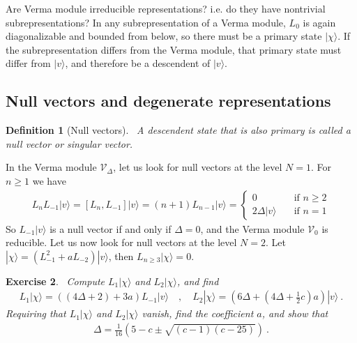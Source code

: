 \documentclass[12pt, a4paper]{article}
\theoremstyle{break}
\newtheorem{exo}{Exercise}[section]
\newtheorem{defn}[exo]{Definition}
\begin{document}
Are Verma module irreducible representations? i.e. do they have nontrivial subrepresentations? In any subrepresentation of a Verma module, $L_0$ is again diagonalizable and bounded from below, so there must be a primary state $|\chi\rangle$. If the subrepresentation differs from the Verma module, that primary state must differ from $|v\rangle$, and therefore be a descendent of $|v\rangle$.

\subsection{Null vectors and degenerate representations}\label{sec:nv}

\begin{defn}[Null vectors]
 ~\label{def:nv}
 A descendent state that is also primary is called a null vector or singular vector.
\end{defn}

In the Verma module $\mathcal V_\Delta$, let us look for null vectors at the level $N=1$. For $n\geq 1$ we have 
\begin{align}
L_n L_{-1}|v\rangle = [L_n, L_{-1}] |v\rangle = (n+1) L_{n-1}|v\rangle = 
\left\{\begin{array}{ll} 0 &  \quad \text{if } n\geq 2 \\ 2\Delta |v\rangle & \quad \text{if } n = 1 \end{array}\right. 
\end{align}
So $L_{-1}|v\rangle$ is a null vector if and only if $\Delta=0$, and the Verma module $\mathcal V_0$ is reducible.
Let us now look for null vectors at the level $N=2$. Let $|\chi\rangle = (L_{-1}^2 + a L_{-2})|v\rangle$, then $L_{n\geq 3} |\chi \rangle =0$. 

\begin{exo}
 ~\label{exo:level2}
 Compute  $L_1|\chi\rangle$ and $L_2|\chi\rangle$, and find 
 \begin{align}
  L_1 |\chi\rangle = \left((4\Delta+2) + 3a\right) L_{-1}|v\rangle
  \quad , \quad L_2 |\chi\rangle= \left(6\Delta + (4\Delta +\tfrac12 c)a\right) |v\rangle\ .
 \end{align}
 Requiring that $L_1|\chi\rangle$ and $L_2|\chi\rangle$ vanish, find the coefficient $a$, and show that
 \begin{align}
 \Delta = \frac{1}{16}\left( 5-c\pm\sqrt{(c-1)(c-25)} \right) \ .
 \label{eq:dpm}
\end{align}
\end{exo}
\end{document}
